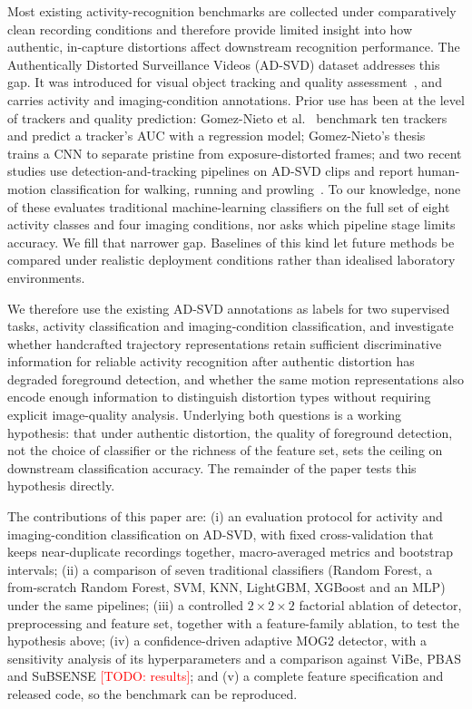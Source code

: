 \documentclass[runningheads]{llncs}
\newcommand{\todo}[1]{\textcolor{red}{[TODO: #1]}}
\begin{document}
Most existing activity-recognition benchmarks are collected under comparatively 
clean recording conditions and therefore provide limited insight into how authentic, 
in-capture distortions affect downstream recognition performance. 
The Authentically Distorted Surveillance Videos (AD-SVD) dataset 
addresses this gap. It was introduced for visual object tracking and quality 
assessment~\cite{gomeznieto2019how,9698081}, and carries activity and imaging-condition 
annotations. Prior use has been at the level of trackers and quality prediction: 
Gomez-Nieto et al.~\cite{9698081} benchmark ten trackers and predict a tracker's AUC 
with a regression model; Gomez-Nieto's thesis~\cite{gomeznieto2021thesis} trains a 
CNN to separate pristine from exposure-distorted frames; and two recent studies use 
detection-and-tracking pipelines on AD-SVD clips and report human-motion classification 
for walking, running and prowling~\cite{shaban2024abnormal,shaban2025multicamera}. To our 
knowledge, none of these evaluates traditional machine-learning classifiers on the full 
set of eight activity classes and four imaging conditions, nor asks which pipeline stage 
limits accuracy. We fill that narrower gap. Baselines of this kind let future methods be 
compared under realistic deployment conditions rather than idealised laboratory 
environments.

We therefore use the existing AD-SVD annotations as labels for two supervised tasks, 
activity classification and imaging-condition classification, and investigate whether 
handcrafted trajectory representations retain sufficient discriminative information 
for reliable activity recognition after authentic distortion has degraded foreground 
detection, and whether the same motion representations also encode enough information 
to distinguish distortion types without requiring explicit image-quality analysis. 
Underlying both questions is a working hypothesis: that under authentic distortion, 
the quality of foreground detection, not the choice of classifier or the richness 
of the feature set, sets the ceiling on downstream classification accuracy. The 
remainder of the paper tests this hypothesis directly.

The contributions of this paper are: (i) an evaluation protocol for activity and 
imaging-condition classification on AD-SVD, with fixed cross-validation that keeps 
near-duplicate recordings together, macro-averaged metrics and bootstrap intervals; 
(ii) a comparison of seven traditional classifiers (Random Forest, a from-scratch Random 
Forest, SVM, KNN, LightGBM, XGBoost and an MLP) under the same pipelines; 
(iii) a controlled $2{\times}2{\times}2$ factorial ablation of detector, preprocessing 
and feature set, together with a feature-family ablation, to test the hypothesis above; 
(iv) a confidence-driven adaptive MOG2 detector, with a sensitivity analysis of its 
hyperparameters and a comparison against ViBe, PBAS and SuBSENSE \todo{results}; and 
(v) a complete feature specification and released code, so the benchmark can be reproduced.
\end{document}
